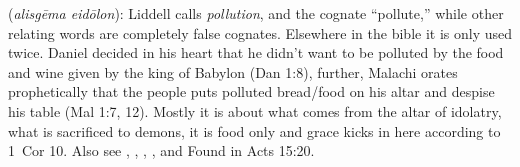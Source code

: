 \item[Idol pollution,]

(\textit{alisgēma eidōlon}):
Liddell calls  \emph{pollution}, and the cognate  ``pollute,'' while other relating words are completely false cognates. Elsewhere in the bible it is only used twice. Daniel decided in his heart that he didn't want to be polluted by the food and wine given by the king of Babylon (Dan 1:8), further, Malachi orates prophetically that the people puts polluted bread/food on his altar and despise his table (Mal 1:7, 12). Mostly it is about what comes from the altar of idolatry, what is sacrificed to demons, it is food only and grace kicks in here according to 1~Cor 10. Also see  , , , , and 
Found in Acts 15:20.
